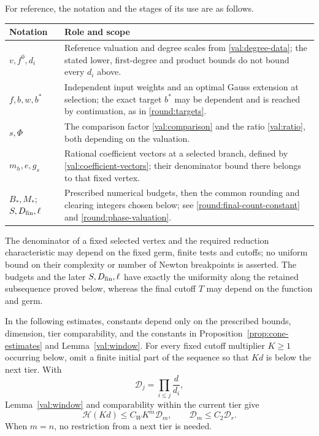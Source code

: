 For reference, the notation and the stages of its use are as follows.
\begin{center}
\small
\begin{tabular}{@{}p{}p{}@{}}
\toprule
Notation & Role and scope \\
\midrule
$v,f^0,d_i$ & Reference valuation and degree scales from
\eqref{val:degree-data}; the stated lower, first-degree and product
bounds do not bound every $d_i$ above. \\
$f,b,w,b^*$ & Independent input weights and an optimal Gauss extension
at selection; the exact target $b^*$ may be dependent and is reached
by continuation, as in \eqref{round:targets}. \\
$s,\Phi$ & The comparison factor \eqref{val:comparison} and the
ratio \eqref{val:ratio}, both depending on the valuation. \\
$m_h,e,g_s$ & Rational coefficient vectors at a selected branch,
defined by \eqref{val:coefficient-vectors}; their denominator bound
there belongs to that fixed vertex. \\
$B_*,M_*$; $S,D_{\rm fin},\ell$ & Prescribed numerical budgets,
then the common rounding and clearing integers chosen below;
see \eqref{round:final-count-constant} and
\eqref{round:phase-valuation}. \\
\bottomrule
\end{tabular}
\end{center}
The denominator of a fixed selected vertex and the required reduction
characteristic may depend on the fixed germ, finite tests and cutoffs;
no uniform bound on their complexity or number of Newton breakpoints
is asserted. The budgets and the later $S,D_{\rm fin},\ell$ have
exactly the uniformity along the retained subsequence proved below,
whereas the final cutoff $T$ may depend on the function and germ.

In the following estimates, constants depend only on the prescribed
bounds, dimension, tier comparability, and the constants in
Proposition~\ref{prop:cone-estimates} and Lemma~\ref{val:window}.
For every fixed cutoff multiplier $K\ge1$ occurring below, omit
a finite initial part of the sequence so that $Kd$ is below the
next tier. With
\begin{equation}\label{round:Dj}
 \mathcal D_j=\prod_{i\le j}\frac d{d_i},
\end{equation}
Lemma~\ref{val:window} and comparability within the current tier give
\begin{equation}\label{round:window-tier}
 \mathcal H(Kd)\le C_WK^m\mathcal D_m,\qquad
 \mathcal D_m\le C_2\mathcal D_r.
\end{equation}
When $m=n$, no restriction from a next tier is needed.

